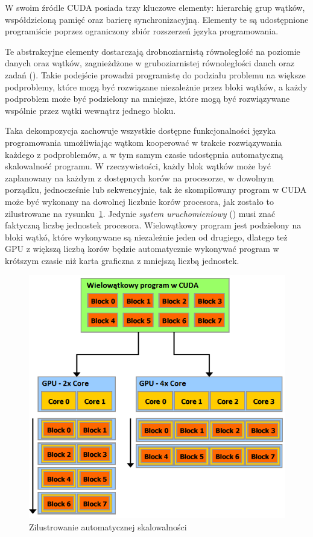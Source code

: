 W swoim źródle CUDA posiada trzy kluczowe elementy: hierarchię grup wątków, współdzieloną pamięć oraz barierę synchronizacyjną. Elementy te są udostępnione programiście poprzez ograniczony zbiór rozszerzeń języka programowania.

Te abstrakcyjne elementy dostarczają drobnoziarnistą równoległość na poziomie danych oraz wątków, zagnieżdżone w gruboziarnistej równoległości danch oraz zadań (). Takie podejście prowadzi programistę do podziału problemu na większe podproblemy, które mogą być rozwiązane niezależnie przez bloki wątków, a każdy podproblem może być podzielony na mniejsze, które mogą być rozwiązywane wspólnie przez wątki wewnątrz jednego bloku.

Taka dekompozycja zachowuje wszystkie dostępne funkcjonalności języka programowania umożliwiając wątkom kooperować w trakcie rozwiązywania każdego z podproblemów, a w tym samym czasie udostępnia automatyczną skalowalność programu. W rzeczywistości, każdy blok wątków może być zaplanowany na każdym z dostępnych korów na procesorze, w dowolnym porządku, jednocześnie lub sekwencyjnie, tak że skompilowany program w CUDA może być wykonany na dowolnej liczbnie korów procesora, jak zostało to zilustrowane na rysunku~\ref{rys:threads_gpu}. Jedynie \emph{system uruchomieniowy} () musi znać faktyczną liczbę jednostek procesora. Wielowątkowy program jest podzielony na bloki wątkó, które wykonywane są niezależnie jeden od drugiego, dlatego też GPU z większą liczbą korów będzie automatycznie wykonywać program w krótszym czasie niż karta graficzna z mniejszą liczbą jednostek.

\begin{figure}[h]
\centering\includegraphics[width=1.0\textwidth]{figures/03/threads_gpu.png}
\caption{Zilustrowanie automatycznej skalowalności~\cite{Cuda:PGuide}}\label{rys:threads_gpu}
\end{figure}

